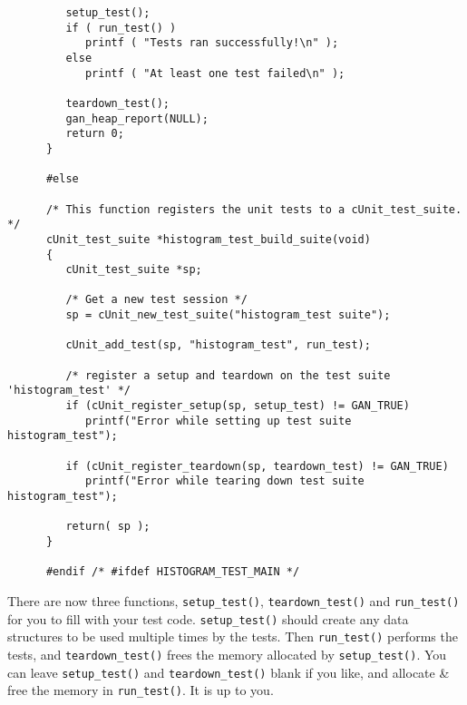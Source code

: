 \begin{verbatim}
         setup_test();
         if ( run_test() )
            printf ( "Tests ran successfully!\n" );
         else
            printf ( "At least one test failed\n" );

         teardown_test();
         gan_heap_report(NULL);
         return 0;
      }

      #else

      /* This function registers the unit tests to a cUnit_test_suite. */
      cUnit_test_suite *histogram_test_build_suite(void)
      {
         cUnit_test_suite *sp;

         /* Get a new test session */
         sp = cUnit_new_test_suite("histogram_test suite");
      
         cUnit_add_test(sp, "histogram_test", run_test);

         /* register a setup and teardown on the test suite 'histogram_test' */
         if (cUnit_register_setup(sp, setup_test) != GAN_TRUE)
            printf("Error while setting up test suite histogram_test");

         if (cUnit_register_teardown(sp, teardown_test) != GAN_TRUE)
            printf("Error while tearing down test suite histogram_test");

         return( sp );
      }

      #endif /* #ifdef HISTOGRAM_TEST_MAIN */
\end{verbatim}
There are now three functions, {\tt setup\_test()}, {\tt teardown\_test()}
and {\tt run\_test()} for you to fill with your test code.
{\tt setup\_test()} should create any data structures to be used multiple
times by the tests. Then {\tt run\_test()} performs the tests, and
{\tt teardown\_test()} frees the memory allocated by {\tt setup\_test()}.
You can leave {\tt setup\_test()} and {\tt teardown\_test()} blank if you
like, and allocate \& free the memory in {\tt run\_test()}.
It is up to you.

